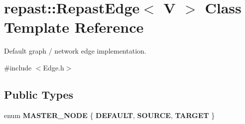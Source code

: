 \hypertarget{classrepast_1_1_repast_edge}{\section{repast\-:\-:Repast\-Edge$<$ V $>$ Class Template Reference}
\label{classrepast_1_1_repast_edge}
}


Default graph / network edge implementation.  




{\ttfamily \#include $<$Edge.\-h$>$}

\subsection*{Public Types}
\begin{DoxyCompactItemize}
\item 
enum {\bfseries M\-A\-S\-T\-E\-R\-\_\-\-N\-O\-D\-E} \{ {\bfseries D\-E\-F\-A\-U\-L\-T}, 
{\bfseries S\-O\-U\-R\-C\-E}, 
{\bfseries T\-A\-R\-G\-E\-T}
 \}
\end{DoxyCompactItemize}
